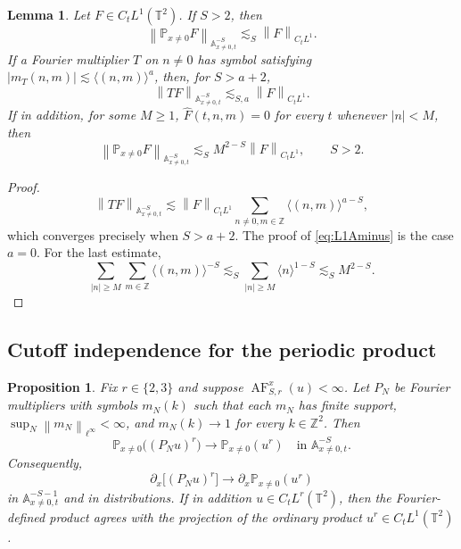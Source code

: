 \documentclass[12pt,reqno,letterpaper]{amsart}
\numberwithin{equation}{section}
\newtheorem{proposition}[theorem]{Proposition}
\newtheorem{lemma}[theorem]{Lemma}
\theoremstyle{definition}
\newcommand{\T}{\mathbb T}
\newcommand{\Z}{\mathbb Z}
\newcommand{\A}{\mathbb A}
\newcommand{\norm}[1]{\left\lVert #1\right\rVert}
\newcommand{\abs}[1]{\left\lvert #1\right\rvert}
\begin{document}
\begin{lemma}\label{lem:L1wiener}
Let $F\in C_tL^1(\T^2)$.  If $S>2$, then
\begin{equation}\label{eq:L1Aminus}
    \norm{\mathbb P_{x\neq0} F}_{\A^{-S}_{x\neq0,t}}
    \lesssim_S \norm{F}_{C_tL^1}.
\end{equation}
If a Fourier multiplier $T$ on $n\neq0$ has symbol satisfying
$\abs{m_T(n,m)}\lesssim\langle(n,m)\rangle^a$, then, for $S>a+2$,
\begin{equation}\label{eq:multiplierL1}
    \norm{TF}_{\A^{-S}_{x\neq0,t}}
    \lesssim_{S,a}\norm{F}_{C_tL^1}.
\end{equation}
If in addition, for some $M\geq1$,
$\widehat F(t,n,m)=0$ for every $t$ whenever $\abs n<M$, then
\begin{equation}\label{eq:gapL1}
    \norm{\mathbb P_{x\neq0} F}_{\A^{-S}_{x\neq0,t}}
    \lesssim_S M^{2-S}\norm{F}_{C_tL^1},
    \qquad S>2.
\end{equation}
\end{lemma}

\begin{proof}
\[
 \norm{TF}_{\A^{-S}_{x\neq0,t}}
 \lesssim \norm{F}_{C_tL^1}
    \sum_{n\neq0,m\in\Z}\langle(n,m)\rangle^{a-S},
\]
which converges precisely when $S>a+2$.  The proof of
\eqref{eq:L1Aminus} is the case $a=0$.  For the last estimate,
\[
 \sum_{\abs n\geq M}\sum_{m\in\Z}\langle(n,m)\rangle^{-S}
 \lesssim_S\sum_{\abs n\geq M}\langle n\rangle^{1-S}
 \lesssim_S M^{2-S}.
\]
\end{proof}

\subsection{Cutoff independence for the periodic product}

\begin{proposition}
\label{prop:cutoff}
Fix $r\in\{2,3\}$ and suppose
$\operatorname{AF}_{S,r}^x(u)<\infty$.  Let $P_N$ be Fourier
multipliers with symbols $m_N(k)$ such that each $m_N$ has finite support,
$\sup_N\norm{m_N}_{\ell^\infty}<\infty$, and $m_N(k)\to1$ for every
$k\in\Z^2$.  Then
\begin{equation}\label{eq:cutoffconv}
 \mathbb P_{x\neq0}\bigl((P_Nu)^r\bigr)
 \longrightarrow\mathbb P_{x\neq0}(u^r)
 \quad\text{in }\A^{-S}_{x\neq0,t}.
\end{equation}
Consequently,
\begin{equation}\label{eq:cutoffderivative}
 \partial_x\bigl[(P_Nu)^r\bigr]
 \longrightarrow\partial_x\mathbb P_{x\neq0}(u^r)
\end{equation}
in $\A^{-S-1}_{x\neq0,t}$ and in distributions.  If in addition
$u\in C_tL^r(\T^2)$, then the Fourier-defined product agrees with the
projection of the ordinary product $u^r\in C_tL^1(\T^2)$.
\end{proposition}
\end{document}
